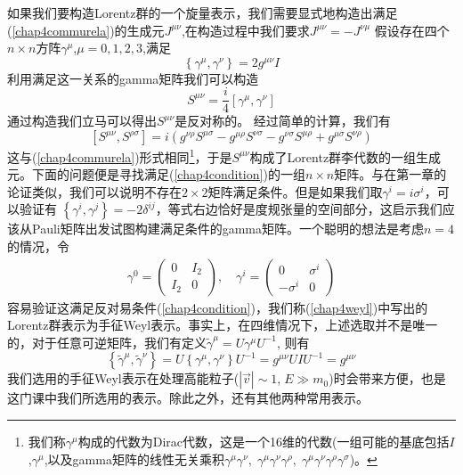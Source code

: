 如果我们要构造Lorentz群的一个旋量表示，我们需要显式地构造出满足(\ref{chap4commurela})的生成元$J^{\mu\nu}$,在构造过程中我们要求$J^{\mu\nu}=-J^{\nu\mu}$
假设存在四个$n\times n$方阵$\gamma^{\mu}$,$\mu=0,1,2,3$,满足
\begin{equation}
\label{chap4condition}
    \left\{\gamma^{\mu},\gamma^{\nu}\right\}=2g^{\mu\nu}I
\end{equation}
利用满足这一关系的gamma矩阵我们可以构造
\begin{equation}
    S^{\mu\nu}=\frac{i}{4}\left[\gamma^{\mu},\gamma^{\nu}\right]
\end{equation}
通过构造我们立马可以得出$S^{\mu\nu}$是反对称的。
经过简单的计算，我们有
\begin{equation}
    \left[S^{\mu\nu},S^{\rho\sigma}\right]=i(g^{\nu\rho}S^{\mu\sigma}-g^{\mu\rho}S^{\nu\sigma}-g^{\nu\sigma}S^{\mu\rho}+g^{\mu\sigma}S^{\nu\rho})
\end{equation}
这与(\ref{chap4commurela})形式相同\footnote{我们称$\gamma^{\mu}$构成的代数为Dirac代数，这是一个16维的代数(一组可能的基底包括$I$,$\gamma^{\mu}$,以及gamma矩阵的线性无关乘积$\gamma^{\mu}\gamma^{\nu},\;\gamma^{\mu}\gamma^{\nu}\gamma^{\rho},\;\gamma^{\mu}\gamma^{\nu}\gamma^{\rho}\gamma^{\sigma}$)。}，于是$S^{\mu\nu}$构成了Lorentz群李代数的一组生成元。下面的问题便是寻找满足(\ref{chap4condition})的一组$n\times n$矩阵。与在第一章的论证类似，我们可以说明不存在$2\times 2$矩阵满足条件。但是如果我们取$\gamma^{i}=i\sigma^{i}$，可以验证有
$\left\{\gamma^{i},\gamma^{j}\right\}=-2\delta^{ij}$，等式右边恰好是度规张量的空间部分，这启示我们应该从Pauli矩阵出发试图构建满足条件的gamma矩阵。一个聪明的想法是考虑$n=4$的情况，令
\begin{equation}
\label{chap4weyl}
    \begin{aligned}
    \gamma^{0}=\left(\begin{array}{cc}
       0  & I_{2} \\
       I_{2}  & 0
    \end{array}\right),\quad
    \gamma^{i}=\left(\begin{array}{cc}
       0  & \sigma^{i} \\
       -\sigma^{i}  & 0
    \end{array}\right)
    \end{aligned}
\end{equation}
容易验证这满足反对易条件(\ref{chap4condition})，我们称(\ref{chap4weyl})中写出的Lorentz群表示为手征Weyl表示。事实上，在四维情况下，上述选取并不是唯一的，对于任意可逆矩阵，我们有定义$\tilde{\gamma}^{\mu}=U\gamma^{\mu} U^{-1}$,
则有
\begin{equation}
    \left\{\tilde{\gamma}^{\mu},\tilde{\gamma}^{\nu}\right\}=U\left\{\gamma^{\mu},\gamma^{\nu}\right\} U^{-1}=g^{\mu\nu}UIU^{-1}=g^{\mu\nu}
\end{equation}
我们选用的手征Weyl表示在处理高能粒子($|\vec{v}|\sim 1$,$\;E\gg m_{0}$)时会带来方便，也是这门课中我们所选用的表示。除此之外，还有其他两种常用表示。

